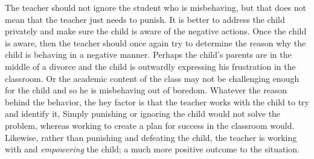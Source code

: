 The teacher should not ignore the student who is misbehaving, but that does not mean that the teacher just needs to punish.
It is better to address the child privately and make sure the child is aware of the negative actions.
Once the child is aware, then the teacher should once again try to determine the reason why the child is behaving in a negative manner.
Perhaps the child's parents are in the middle of a divorce and the child is outwardly expressing his frustration in the classroom.
Or the academic content of the class may not be challenging enough for the child and so he is misbehaving out of boredom.
Whatever the reason behind the behavior, the hey factor is that the teacher works with the child to try and identify it,
Simply punishing or ignoring the child would not solve the problem, whereas working to create a plan for success in the classroom would.
Likewise, rather than punishing and defeating the child, the teacher is working with and \emph{empowering} the child; a much more positive outcome to the situation.